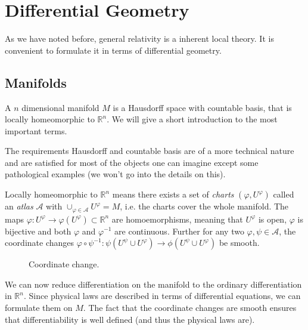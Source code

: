 \chapter{Differential Geometry}
As we have noted before, general relativity is a inherent local theory. It is
convenient to formulate it in terms of differential geometry.
\section{Manifolds}
\begin{definition}
A $n$ dimensional manifold $M$ is a Hausdorff space with countable basis, that
is locally homeomorphic to $\mathbb{R}^n$. We will give a short introduction to
the most important terms.
\end{definition}
\begin{remark}
The requirements Hausdorff and countable basis are of a more technical nature and are satisfied for most of the objects one can imagine 
except some pathological examples (we won't go into the details on this).

Locally homeomorphic to $\mathbb{R}^n$ means there exists a set of \emph{charts} 
$(\varphi,U^\varphi)$ called an \emph{atlas} $\mathcal{A}$ with $\cup_{\varphi\in\mathcal{A}} U^\varphi =M$, 
i.e. the charts cover the whole manifold. The maps $\varphi:U^\varphi\to \varphi(U^\varphi)\subset\mathbb{R}^n $ are homoemorphisms, 
meaning that $U^\varphi$ is open, $\varphi$ is bijective and both $\varphi$ and $\varphi^{-1}$ are continuous.
Further for any two $\varphi,\psi\in \mathcal{A}$, the coordinate changes 
$\varphi\circ\psi^{-1}:\psi(U^\psi\cup U^\varphi)\to \phi(U^\psi\cup U^\varphi)$
be smooth\footnotemark .
\end{remark}
\begin{figure}
    \begin{center}
    \end{center}
    \caption{Coordinate change.} %
\end{figure}
We can now reduce differentiation on the manifold to the ordinary differentiation in $\mathbb{R}^n$. 
Since physical laws are described in terms of differential equations, we can formulate them on $M$. 
The fact that the coordinate changes are smooth ensures that differentiability
is well defined (and thus the physical laws are).

